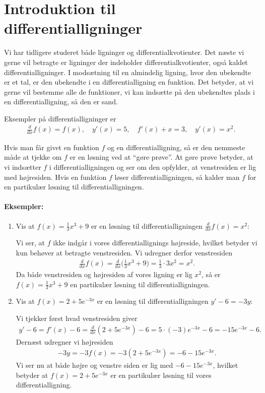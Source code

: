 \section{Introduktion til differentialligninger}
\noindent Vi har tidligere studeret både ligninger og differentialkvotienter. Det næste vi gerne vil betragte er ligninger der indeholder differentialkvotienter, også kaldet differentialligninger. I modsætning til en almindelig ligning, hvor den ubekendte er et tal, er den ubekendte i en differentialligning en funktion. Det betyder, at vi gerne vil bestemme alle de funktioner, vi kan indsætte på den ubekendtes plads i en differentialligning, så den er sand.

Eksempler på differentialligninger er
\begin{align*}
\frac{d}{dx}f(x) = f(x), \quad y'(x)=5, \quad f'(x) +x = 3, \quad y'(x)=x^2.
\end{align*}

Hvis man får givet en funktion $f$ og en differentialligning, så er den nemmeste måde at tjekke om $f$ er en løsning ved at ``gøre prøve''. At gøre prøve betyder, at vi indsætter $f$ i differentialligningen og ser om den opfylder, at venstresiden er lig med højresiden. Hvis en funktion $f$ løser differentialligningen, så kalder man $f$ for en partikulær løsning til differentialligningen.

\paragraph*{Eksempler:}
\begin{enumerate}
\item Vis at $f(x)=\frac{1}{3}x^3+9$ er en løsning til differentialligningen $\displaystyle \frac{d}{dx}f(x) = x^2$:

Vi ser, at $f$ ikke indgår i vores differentiallignings højreside, hvilket betyder vi kun behøver at betragte venstresiden. Vi udregner derfor venstresiden
\begin{align*}
\frac{d}{dx}f(x)= \frac{d}{dx} \Big( \frac{1}{3}x^3+9 \Big) = \frac{1}{3}\cdot 3 x^2 = x^2.
\end{align*}
Da både venstresiden og højresiden af vores ligning er lig $x^2$, så er $f(x)=\frac{1}{3}x^3 + 9$ en partikulær løsning til differentialligningen.
\item Vis at $f(x)=2+5e^{-3x}$ er en løsning til differentialligningen $y'-6=-3y$:

Vi tjekker først hvad venstresiden giver
\begin{align*}
y'-6=f'(x) -6 = \frac{d}{dx}(2+5e^{-3x} )-6 = 5 \cdot (-3) e^{-3x}-6 = -15e^{-3x}-6.
\end{align*}
Dernæst udregner vi højresiden
\begin{align*}
-3y = -3f(x) = -3(2+5e^{-3x}) = -6 -15 e^{-3x}.
\end{align*}
Vi ser nu at både højre og venstre siden er lig med $-6-15e^{-3x}$, hvilket betyder at $f(x)=2+5e^{-3x}$ er en partikulær løsning til vores differentialligning.
\end{enumerate}

